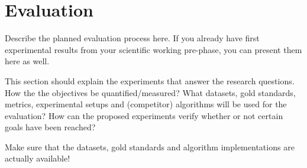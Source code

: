 \section{Evaluation}
\label{sec:evalution}

Describe the planned evaluation process here. If you already have first experimental results from your scientific working pre-phase, you can present them here as well.

This section should explain the experiments that answer the research questions. How the the objectives be quantified/measured? What datasets, gold standards, metrics, experimental setups and (competitor) algorithms will be used for the evaluation? How can the proposed experiments verify whether or not certain goals have been reached?

Make sure that the datasets, gold standards and algorithm implementations are actually available!
